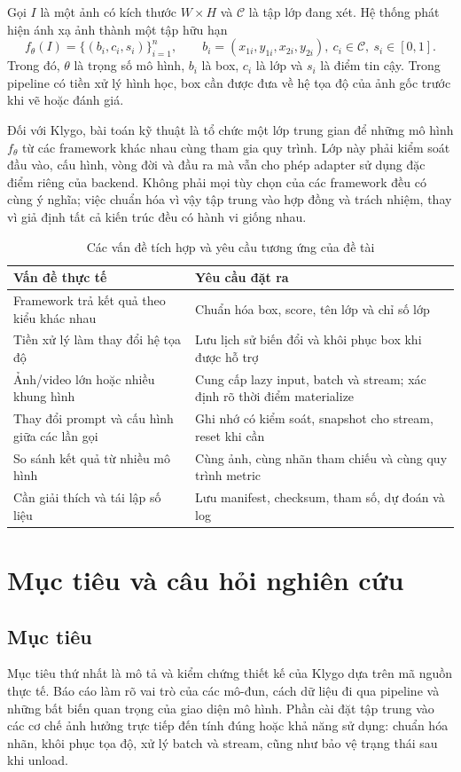 Gọi $I$ là một ảnh có kích thước $W\times H$ và $\mathcal{C}$ là tập lớp đang xét. Hệ thống phát hiện ánh xạ ảnh thành một tập hữu hạn
\begin{equation}
f_{\theta}(I)=\{(b_i,c_i,s_i)\}_{i=1}^{n},\qquad
b_i=(x_{1i},y_{1i},x_{2i},y_{2i}),\ c_i\in\mathcal{C},\ s_i\in[0,1].
\end{equation}
Trong đó, $\theta$ là trọng số mô hình, $b_i$ là box, $c_i$ là lớp và $s_i$ là điểm tin cậy. Trong pipeline có tiền xử lý hình học, box cần được đưa về hệ tọa độ của ảnh gốc trước khi vẽ hoặc đánh giá.

Đối với Klygo, bài toán kỹ thuật là tổ chức một lớp trung gian để những mô hình $f_{\theta}$ từ các framework khác nhau cùng tham gia quy trình. Lớp này phải kiểm soát đầu vào, cấu hình, vòng đời và đầu ra mà vẫn cho phép adapter sử dụng đặc điểm riêng của backend. Không phải mọi tùy chọn của các framework đều có cùng ý nghĩa; việc chuẩn hóa vì vậy tập trung vào hợp đồng và trách nhiệm, thay vì giả định tất cả kiến trúc đều có hành vi giống nhau.

\begin{table}[H]\centering\small
\caption{Các vấn đề tích hợp và yêu cầu tương ứng của đề tài}
\begin{tabularx}{\textwidth}{YY}
\toprule Vấn đề thực tế & Yêu cầu đặt ra \\\midrule
Framework trả kết quả theo kiểu khác nhau & Chuẩn hóa box, score, tên lớp và chỉ số lớp \\
Tiền xử lý làm thay đổi hệ tọa độ & Lưu lịch sử biến đổi và khôi phục box khi được hỗ trợ \\
Ảnh/video lớn hoặc nhiều khung hình & Cung cấp lazy input, batch và stream; xác định rõ thời điểm materialize \\
Thay đổi prompt và cấu hình giữa các lần gọi & Ghi nhớ có kiểm soát, snapshot cho stream, reset khi cần \\
So sánh kết quả từ nhiều mô hình & Cùng ảnh, cùng nhãn tham chiếu và cùng quy trình metric \\
Cần giải thích và tái lập số liệu & Lưu manifest, checksum, tham số, dự đoán và log \\
\bottomrule
\end{tabularx}
\end{table}

\section{Mục tiêu và câu hỏi nghiên cứu}
\subsection{Mục tiêu}
Mục tiêu thứ nhất là mô tả và kiểm chứng thiết kế của Klygo dựa trên mã nguồn thực tế. Báo cáo làm rõ vai trò của các mô-đun, cách dữ liệu đi qua pipeline và những bất biến quan trọng của giao diện mô hình. Phần cài đặt tập trung vào các cơ chế ảnh hưởng trực tiếp đến tính đúng hoặc khả năng sử dụng: chuẩn hóa nhãn, khôi phục tọa độ, xử lý batch và stream, cũng như bảo vệ trạng thái sau khi unload.

